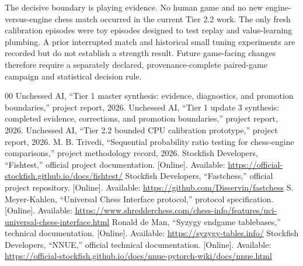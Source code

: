 \documentclass[conference]{IEEEtran}
\begin{document}
The decisive boundary is playing evidence. No human game and no new engine-versus-engine chess match occurred in the current Tier 2.2 work. The only fresh calibration episodes were toy episodes designed to test replay and value-learning plumbing. A prior interrupted match and historical small tuning experiments are recorded but do not establish a strength result. Future game-facing changes therefore require a separately declared, provenance-complete paired-game campaign and statistical decision rule.

\balance
\begin{thebibliography}{00}
 Unchessed AI, ``Tier 1 master synthesis: evidence, diagnostics, and promotion boundaries,'' project report, 2026.
 Unchessed AI, ``Tier 1 update 3 synthesis: completed evidence, corrections, and promotion boundaries,'' project report, 2026.
 Unchessed AI, ``Tier 2.2 bounded CPU calibration prototype,'' project report, 2026.
 M. B. Trivedi, ``Sequential probability ratio testing for chess-engine comparisons,'' project methodology record, 2026.
 Stockfish Developers, ``Fishtest,'' official project documentation. [Online]. Available: \url{https://official-stockfish.github.io/docs/fishtest/}
 Stockfish Developers, ``Fastchess,'' official project repository. [Online]. Available: \url{https://github.com/Disservin/fastchess}
 S. Meyer-Kahlen, ``Universal Chess Interface protocol,'' protocol specification. [Online]. Available: \url{https://www.shredderchess.com/chess-info/features/uci-universal-chess-interface.html}
 Ronald de Man, ``Syzygy endgame tablebases,'' technical documentation. [Online]. Available: \url{https://syzygy-tables.info/}
 Stockfish Developers, ``NNUE,'' official technical documentation. [Online]. Available: \url{https://official-stockfish.github.io/docs/nnue-pytorch-wiki/docs/nnue.html}
\end{thebibliography}
\end{document}
